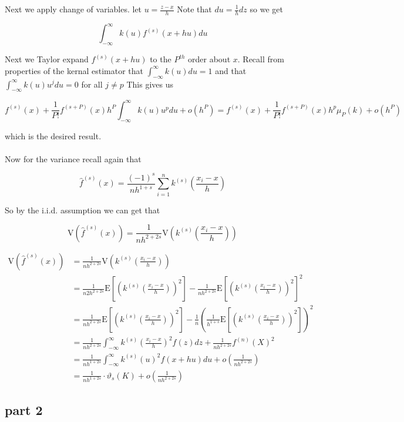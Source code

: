 \documentclass[11pt]{article}
\newcommand{\E}{\mathrm{E}}
\newcommand{\V}{\mathrm{V}}
\begin{document}
Next we apply change of variables. let $u = \frac{z - x}{h}$ Note that $du=\frac{1}{h}dz$ so we get 

$$ \int_{-\infty}^{\infty}  k(u)f^{(s)}(x+hu)du $$

Next we Taylor expand $f^{(s)}(x+hu)$ to the $P^{th}$ order about $x$. Recall from properties of the kernal estimator that $ \int_{-\infty}^{\infty}k(u)du = 1$ and that $ \int_{-\infty}^{\infty}k(u)u^jdu = 0$ for all $j\neq p$ This gives us

$$ f^{(s)}(x) +\frac{1}{P!}f^{(s+P)}(x)h^P\int_{-\infty}^{\infty}k(u)u^pdu +o(h^P)
= f^{(s)}(x) +\frac{1}{P!}f^{(s+P)}(x)h^p \mu_P(k) +o(h^P)
$$

which is the desired result. 
\\ \\ 

Now for the variance recall again that 

$$ \hat{f}^{(s)}(x) = \frac{(-1)^s}{nh^{1+s}} \sum_{i=1}^{n}k^{(s)} \left( \frac{{x}_i - x}{h} \right) 
$$

So by the i.i.d. assumption we can get that 

$$ \V \left(\hat{f}^{(s)}(x) \right) = \frac{1}{nh^{2+2s}} \V \left( k^{(s)} \left( \frac{{x}_i - x}{h} \right)  \right)
$$

\begin{align}
\V \left(\hat{f}^{(s)}(x) \right) &= \frac{1}{nh^{2+2s}} \V \left( k^{(s)} \left( \frac{{x}_i - x}{h} \right)  \right)\\
 &= \frac{1}{n2h^{2+2s}} \E \left[\left( k^{(s)} \left( \frac{{x}_i - x}{h} \right)  \right)^2 \right] - \frac{1}{nh^{2+2s}} \E \left[\left( k^{(s)} \left( \frac{{x}_i - x}{h} \right)  \right)^2 \right]^2 \\
  &= \frac{1}{nh^{2+2s}} \E \left[\left( k^{(s)} \left( \frac{{x}_i - x}{h} \right)  \right)^2 \right] - \frac{1}{n}\left( \frac{1}{h^{1+s}} \E \left[\left( k^{(s)} \left( \frac{{x}_i - x}{h} \right)  \right)^2 \right] \right)^2 \\
  &=  \frac{1}{nh^{2+2s}} \int_{-\infty}^{\infty}k^{(s)} \left( \frac{{x}_i - x}{h} \right)^2 f(z)dz +   \frac{1}{nh^{2+2s}} f^{(n)}(X)^2 \\
  &= \frac{1}{nh^{1+2s}} \int_{-\infty}^{\infty} k^{(s)}(u)^2f(x+hu)du + o\left(\frac{1}{nh^{2+2s}} \right)\\
  &= \frac{1}{nh^{1+2s}} \cdot \vartheta_s(K) + o\left(\frac{1}{nh^{2+2s}} \right)
\end{align}

\subsection{part 2}
\end{document}
